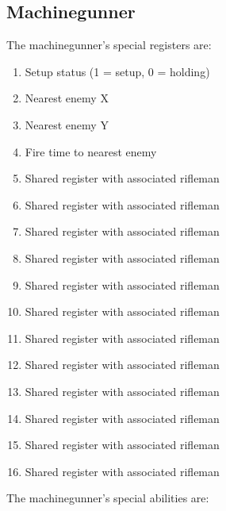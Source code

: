 \documentclass{article}
\begin{document}
\subsection*{Machinegunner}

The machinegunner's special registers are:

\begin{enumerate}[noitemsep]
    \item Setup status (1 = setup, 0 = holding)
    \item Nearest enemy X
    \item Nearest enemy Y
    \item Fire time to nearest enemy
    \item Shared register with associated rifleman
    \item Shared register with associated rifleman
    \item Shared register with associated rifleman
    \item Shared register with associated rifleman
    \item Shared register with associated rifleman
    \item Shared register with associated rifleman
    \item Shared register with associated rifleman
    \item Shared register with associated rifleman
    \item Shared register with associated rifleman
    \item Shared register with associated rifleman
    \item Shared register with associated rifleman
    \item Shared register with associated rifleman
\end{enumerate}

The machinegunner's special abilities are:
\end{document}
